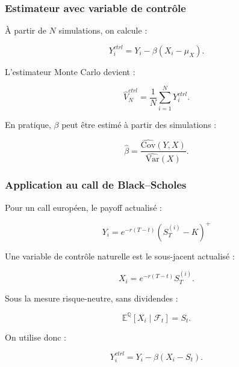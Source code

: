 \documentclass[aspectratio=169,11pt]{beamer}
\begin{document}
\begin{frame}
    \frametitle{Estimateur avec variable de contrôle}

    À partir de $N$ simulations, on calcule :

    \[
        Y_i^{ctrl}
        =
        Y_i
        -
        \beta
        \left(
            X_i-\mu_X
        \right).
    \]

    \vspace{0.3cm}

    L'estimateur Monte Carlo devient :

    \[
        \boxed{
        \widehat{V}_N^{ctrl}
        =
        \frac{1}{N}
        \sum_{i=1}^{N}
        Y_i^{ctrl}.
        }
    \]

    \vspace{0.3cm}

    En pratique, $\beta$ peut être estimé à partir des simulations :

    \[
        \widehat{\beta}
        =
        \frac{
            \widehat{\mathrm{Cov}}(Y,X)
        }{
            \widehat{\mathrm{Var}}(X)
        }.
    \]

\end{frame}

\begin{frame}
    \frametitle{Application au call de Black--Scholes}

    Pour un call européen, le payoff actualisé :

    \[
        Y_i
=
e^{-r(T-t)}
\left(S_T^{(i)}-K\right)^+
    \]

    \vspace{0.25cm}

    Une variable de contrôle naturelle est le sous-jacent actualisé :

    \[
        X_i
=
e^{-r(T-t)}S_T^{(i)}.
    \]

    \vspace{0.25cm}

    Sous la mesure risque-neutre, sans dividendes :

    \[
        \boxed{
        \mathbb{E}^{\mathbb{Q}}[X_i\mid\mathcal{F}_t]
        =
        S_t.
        }
    \]

    \vspace{0.25cm}

    On utilise donc :

    \[
        \boxed{
        Y_i^{ctrl}
        =
        Y_i
        -
        \beta
        \left(
            X_i-S_t
        \right).
        }
    \]

\end{frame}
\end{document}
